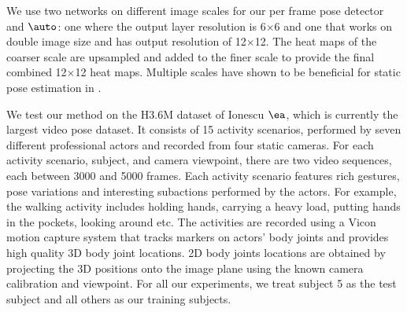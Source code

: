 \documentclass[10pt,twocolumn,letterpaper]{article}
\begin{document}
We use two  networks on different image scales for our per frame pose detector and $\auto$: one where the output layer  resolution is 6$\times$6 and one that works on double  image size and has output resolution of 12$\times$12. The  heat maps of the coarser scale are upsampled and added to the finer scale to provide the final combined 12$\times$12 heat maps. Multiple scales have shown to be beneficial  for static pose estimation  in \cite{vpsKpsTulsianiM14,DBLP:conf/nips/TompsonJLB14,DBLP:journals/corr/ToshevS13}.
  
  
We test our method on the H3.6M dataset of Ionescu $\ea$\cite{h36m_pami}, which is currently the largest video pose dataset. It consists of 15  activity scenarios, %
performed by seven  different professional  actors and  recorded from four static cameras. For each activity scenario, subject, and camera viewpoint, there are two video sequences, each  between 3000 and 5000 frames. Each activity scenario features rich gestures, pose variations and interesting subactions  performed by the actors. For example, the walking activity includes holding hands, carrying a heavy load, putting hands in the pockets,  looking around etc. %
The activities are recorded using a Vicon motion capture system that tracks markers on actors' body joints and provides  high quality 3D body joint locations. 
2D body joints locations are obtained by projecting the 3D positions onto the image plane using the  known camera calibration and viewpoint. For all our experiments, we treat subject 5 as the test subject and all others as our training subjects. 
\end{document}
